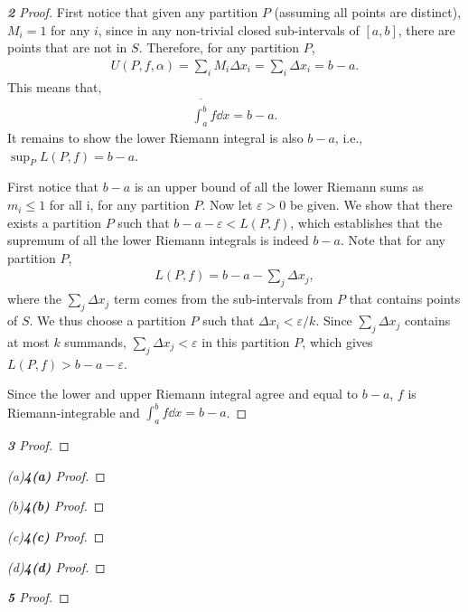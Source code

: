 \documentclass[12pt]{article}
\newenvironment{fproof}[1][]
  {\begin{proof}[\ifx\relax#1\relax\else\textbf{\large #1} Proof\fi]}
  {\end{proof}}
\newcommand{\upint}[2]{\overline{\int_{#1}^{#2}}}
\begin{document}
\begin{fproof}[2]
  First notice that given any partition \(P\) (assuming all points are distinct), \(M_i = 1\) for any \(i\), since in any non-trivial closed sub-intervals of \([a,b]\), there are points that are not in \(S\).
  Therefore, for any partition \(P\),
  \begin{align*}
    U(P, f, \alpha) = \sum_i M_i \Delta x_i = \sum_i \Delta x_i = b - a.
  \end{align*}
  This means that,
  \begin{align*}
    \upint{a}{b} f \dd x = b - a.
  \end{align*}
  It remains to show the lower Riemann integral is also \(b-a\), 
  i.e., \(\sup_{P} L(P, f) = b-a\).

  First notice that \(b-a\) is an upper bound of all the lower Riemann sums as \(m_i \leq 1\) for all i, for any partition \(P\).
  Now let \(\varepsilon > 0\) be given.
  We show that there exists a partition \(P\) such that \(b-a - \varepsilon < L(P,f)\), which establishes that the supremum of all the lower Riemann integrals is indeed \(b-a\).
  Note that for any partition \(P\),
  \begin{align*}
    L(P,f) = b - a - \sum_j \Delta x_j,
  \end{align*}
  where the \(\sum_j \Delta x_j\) term comes from the sub-intervals from \(P\) that contains points of \(S\).
  We thus choose a partition \(P\) such that \(\Delta x_i < \varepsilon/k\).
  Since \(\sum_j \Delta x_j\) contains at most \(k\) summands, \(\sum_j \Delta x_j < \varepsilon\) in this partition \(P\), which gives \(L(P,f) > b-a-\varepsilon\).

  Since the lower and upper Riemann integral agree and equal to \(b-a\), \(f\) is Riemann-integrable and \(\int_{a}^{b} f \dd x = b-a\).



\end{fproof}

\newpage

\begin{fproof}[3]
\end{fproof}

\newpage

\begin{fproof}[4(a)]
\end{fproof}

\begin{fproof}[4(b)]
\end{fproof}

\begin{fproof}[4(c)]
\end{fproof}

\begin{fproof}[4(d)]
\end{fproof}

\newpage

\begin{fproof}[5]
\end{fproof}
\end{document}
